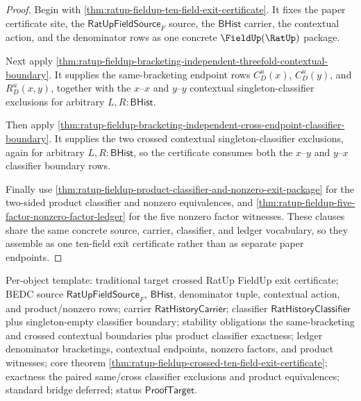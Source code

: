 \begin{proof}
Begin with \autoref{thm:ratup-fieldup-ten-field-exit-certificate}. It fixes the
paper certificate site, the $\mathsf{RatUpFieldSource}_F$ source, the
$\mathsf{BHist}$ carrier, the contextual action, and the denominator rows as one
concrete $\FieldUp(\RatUp)$ package.

Next apply
\autoref{thm:ratup-fieldup-bracketing-independent-threefold-contextual-boundary}.
It supplies the same-bracketing endpoint rows $C_D^u(x)$, $C_D^u(y)$, and
$R_D^u(x,y)$, together with the $x$--$x$ and $y$--$y$ contextual
singleton-classifier exclusions for arbitrary $L,R:\mathsf{BHist}$.

Then apply
\autoref{thm:ratup-fieldup-bracketing-independent-cross-endpoint-classifier-boundary}.
It supplies the two crossed contextual singleton-classifier exclusions, again
for arbitrary $L,R:\mathsf{BHist}$, so the certificate consumes both the
$x$--$y$ and $y$--$x$ classifier boundary rows.

Finally use
\autoref{thm:ratup-fieldup-product-classifier-and-nonzero-exit-package} for the
two-sided product classifier and nonzero equivalences, and
\autoref{thm:ratup-fieldup-five-factor-nonzero-factor-ledger} for the five
nonzero factor witnesses. These clauses share the same concrete source,
carrier, classifier, and ledger vocabulary, so they assemble as one ten-field
exit certificate rather than as separate paper endpoints.
\end{proof}

Per-object template: traditional target crossed RatUp FieldUp exit certificate;
BEDC source $\mathsf{RatUpFieldSource}_F$, $\mathsf{BHist}$, denominator tuple,
contextual action, and product/nonzero rows; carrier
$\mathsf{RatHistoryCarrier}$; classifier $\mathsf{RatHistoryClassifier}$ plus
singleton-empty classifier boundary; stability obligations the same-bracketing
and crossed contextual boundaries plus product classifier exactness; ledger
denominator bracketings, contextual endpoints, nonzero factors, and product
witnesses; core theorem
\autoref{thm:ratup-fieldup-crossed-ten-field-exit-certificate}; exactness the
paired same/cross classifier exclusions and product equivalences; standard
bridge deferred; status $\mathsf{ProofTarget}$.
